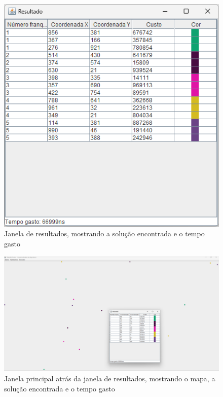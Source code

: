 \documentclass[12pt]{article}
\begin{document}
\begin{figure}[H]
    \centering
    \includegraphics[width=\textwidth]{Captura de tela 2024-06-01 110920}
    \caption{Janela de resultados, mostrando a solução encontrada e o tempo gasto}
    \label{fig:fig-4}
\end{figure}

\begin{figure}[H]
    \centering
    \includegraphics[width=\textwidth]{Captura de tela 2024-06-01 110931}
    \caption{Janela principal atrás da janela de resultados, mostrando o mapa, a solução encontrada e o tempo gasto}
    \label{fig:fig-5}
\end{figure}
\end{document}
